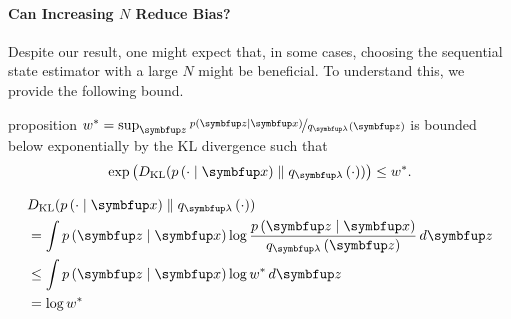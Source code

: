 
\vspace{-0.05in}
\paragraph{Can Increasing \(N\) Reduce Bias?}
Despite our result, one might expect that, in some cases, choosing the sequential state estimator with a large \(N\) might be beneficial.
To understand this, we provide the following bound.



\begin{theoremEnd}{proposition}\label{thm:kl_bound}
  \(w^* = \sup_{\vz} \nicefrac{p\left(\vz\mid\vx\right)}{q_{\vlambda}\left(\vz\right)} \) is bounded below exponentially by the KL divergence such that
  \[
  \exp\left(\DKL{p\left(\cdot\mid\vx\right)}{ q_{\vlambda}\left(\cdot\right) }\right) \leq w^*.
  \]
\end{theoremEnd}
\vspace{-0.1in}
\begin{proofEnd}
  \begin{align*}
    &\DKL{p\left(\cdot\mid\vx\right)}{ q_{\vlambda}\left(\cdot\right) } \\
    &= \int p\left(\vz\mid\vx\right) \log \frac{p\left(\vz\mid\vx\right)}{q_{\vlambda}\left(\vz\right)}\,d\vz \\
    &\leq \int p\left(\vz\mid\vx\right) \log w^* \, d\vz \\
    &= \log w^*
  \end{align*}
\end{proofEnd}

